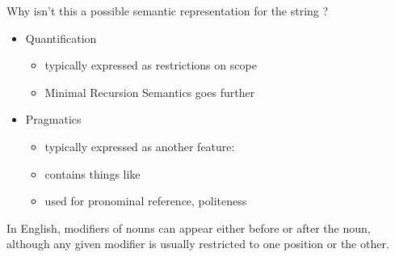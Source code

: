 \documentclass[a4paper,landscape,headrule,footrule,dvips]{foils}
\begin{document}
Why isn’t this a possible semantic representation for
the string ?

\noindent{}


\begin{itemize}
\item Quantification
  \begin{itemize}
  \item typically expressed as restrictions on scope
  \item Minimal Recursion Semantics goes further
  \end{itemize}
\item Pragmatics
  \begin{itemize}
  \item typically expressed as another feature: 
  \item contains things like 
  \item used for pronominal reference, politeness
\end{itemize}
\end{itemize}


In English, modifiers of nouns can appear either
before or after the noun, although any given modifier is usually
restricted to one position or the other.
\end{document}
